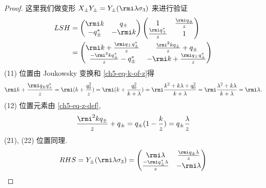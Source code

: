 \begin{proof}
    这里我们做变形 $X_{\pm} Y_{\pm} = Y_{\pm} (\rmi \lambda \sigma_{3})$ 来进行验证
    \begin{equation}
        \begin{aligned}
            LSH & = \begin{pmatrix}
                        \rmi k & q_{\pm} \\ -q_{\pm}^{*} & -\rmi k
                    \end{pmatrix}
            \begin{pmatrix}
                1                          & \frac{\rmi q_{\pm}}{z} \\
                \frac{\rmi q_{\pm}^{*}}{z} & 1
            \end{pmatrix}                                                                                                               \\
                & = \begin{pmatrix}
                        \rmi k + \frac{\rmi q_{\pm} q_{\pm}^{*}}{z}     & \frac{\rmi^{2} k q_{\pm}}{z} + q_{\pm}       \\
                        \frac{-\rmi^{2} k q_{\pm}^{*}}{z} - q_{\pm}^{*} & -\rmi k + \frac{\rmi q_{\pm} q_{\pm}^{*}}{z}
                    \end{pmatrix} \\
        \end{aligned}
    \end{equation}
    (11) 位置由 Joukowsky 变换和 \eqref{ch5-eq-k-of-z}得
    \begin{equation}
        \rmi k + \frac{\rmi q_{\pm} q_{\pm}^{*}}{z} = \rmi (k + \frac{q_{0}^{2}}{z}) = \rmi (k + \frac{q_{0}^{2}}{k+\lambda}) = \rmi \frac{k^{2} + k \lambda + q_{0}^{2}}{k+\lambda} = \rmi \frac{\lambda^{2} + k \lambda}{k+\lambda} = \rmi \lambda.
    \end{equation}
    (12) 位置元素由 \eqref{ch5-eq-z-def},
    \begin{equation}
        \frac{\rmi^{2} k q_{\pm}}{z} + q_{\pm} = q_{\pm}(1-\frac{k}{z}) = q_{\pm} \frac{\lambda}{z}
    \end{equation}
    (21), (22) 位置同理.
    \begin{equation}
        RHS = Y_{\pm} (\rmi \lambda \sigma_{3}) = \begin{pmatrix}
            \rmi \lambda                        & \frac{\rmi q_{\pm} \lambda}{z} \\
            \frac{-\rmi q_{\pm}^{*} \lambda}{z} & -\rmi \lambda
        \end{pmatrix}
    \end{equation}
\end{proof}
